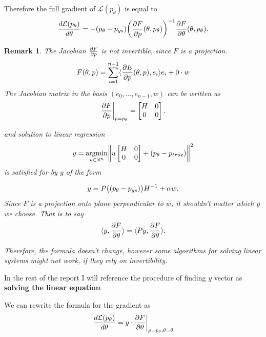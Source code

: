 \documentclass[a4paper,10.5pt]{report}
\newtheorem{remark}{Remark}
\begin{document}
Therefore the full gradient of $\mathcal{L}(p_\theta)$ is equal to
\begin{equation}
 \frac{d\mathcal{L}(p_\theta)}{d \theta} = - (p_\theta - p_{gs})\bigg(\frac{\partial F}{\partial p}(\theta,p_\theta)\bigg)^{-1} \frac{\partial F}{\partial \theta}(\theta,p_\theta).
\end{equation}
 \begin{remark}
 The Jacobian $\frac{\partial F}{\partial p}$ is not invertible, since $F$ is a projection.
  \begin{equation}
   F(\theta, p) = \sum_{i=1}^{n-1} \langle \frac{\partial E}{\partial p}(\theta, p), e_i \rangle e_i +  0 \cdot w
  \end{equation}
%
 The Jacobian matrix in the basis $(e_0,...,e_{n-1},w)$ can be written as \begin{equation}
                      \frac{\partial F}{\partial p}\bigg|_{p=p_\theta} =\begin{bmatrix}
H & 0 \\
0 & 0
\end{bmatrix}.
\end{equation}

and solution to linear regression
\begin{equation}
 y = \underset{u\in \mathbb{R}^n}{\mathrm{argmin }}\bigg\|u \begin{bmatrix}
H & 0 \\
0 & 0
\end{bmatrix} + (p_\theta-p_{true})\bigg\|^2
\end{equation}
is satisfied for by $y$ of the form

\begin{equation}
 y = P\big((p_\theta-p_{gs})\big)H^{-1} + \alpha w.
\end{equation}
Since $F$ is a projection onto plane perpendicular to $w$, it shouldn't matter which $y$ we choose.
That is to say
\begin{equation}
 \langle y,  \frac{\partial F}{\partial \theta} \rangle=\langle Py, \frac{\partial F}{\partial \theta} \rangle.
\end{equation}



Therefore, the formula doesn't change, however some algorithms for solving linear systems might not work, if they rely on invertibility.

\end{remark}


In the rest of the report I will reference the procedure of finding $y$ vector as \textbf{solving the linear equation}.


We can rewrite the formula for the gradient as
\begin{equation}
 \frac{d\mathcal{L}(p_\theta)}{d \theta} = y \cdot  \frac{\partial F}{\partial \theta}\bigg|_{p=p_\theta, \theta=\theta}
\end{equation}
\end{document}
